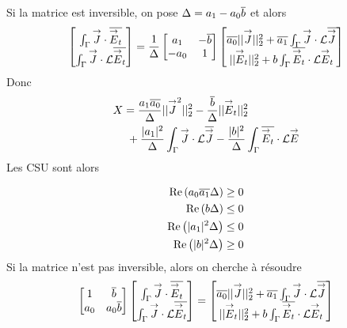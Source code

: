       Si la matrice est inversible, on pose \(\Delta = a_1 - a_0\conj{b}\) et alors
      \[
      \begin{bmatrix}
        \int_\Gamma \vJ \cdot \conj{\vE_t} \\
        \int_\Gamma \vJ\cdot \LL\conj{\vE_t}
      \end{bmatrix}
      =\frac{1}{\Delta}
      \begin{bmatrix}
        a_1 & -\conj{b} \\
        -a_0 & 1
      \end{bmatrix}
      \begin{bmatrix}
        \conj{a_0}||\vJ||_2^2 + \conj{a_1}\int_\Gamma \vJ \cdot \LL\conj{\vJ} \\
        ||\vE_t||_2^2 + b\int_\Gamma \conj{\vE_t} \cdot \LL\vE_t
      \end{bmatrix}
      \]
      Donc
      \begin{align*}
        X &=  \frac{a_1\conj{a_0}}{\Delta}||\vJ^2||_2^2 - \frac{\conj{b}}{\Delta}||\vE_t||_2^2 \\
        &~+\frac{|a_1|^2}{\Delta}\int_\Gamma\vJ\cdot \LL \conj{\vJ} - \frac{|b|^2}{\Delta}\int_\Gamma\conj{\vE_t}\cdot \LL\vE
      \end{align*}
      Les CSU sont alors

        \begin{align}
        \Re\left(a_0\conj{a_1}\Delta\right) &\ge 0\\
        \Re\left(b\Delta\right) &\le 0\\
        \Re\left(|a_1|^2\Delta\right) &\le 0\\
        \Re\left(|b|^2\Delta\right) &\ge 0
      \end{align}
      Si la matrice n'est pas inversible, alors on cherche à résoudre
      \[
        \begin{bmatrix}
          1 & \conj{b} \\
          a_0 & a_0\conj{b}
        \end{bmatrix}
        \begin{bmatrix}
          \int_\Gamma \vJ \cdot \conj{\vE_t} \\
          \int_\Gamma \vJ \cdot \LL\conj{\vE_t}
        \end{bmatrix}
        =
        \begin{bmatrix}
          \conj{a_0}||\vJ||_2^2 + \conj{a_1}\int_\Gamma \vJ \cdot \LL\conj{\vJ} \\
          ||\vE_t||_2^2 + b\int_\Gamma \conj{\vE_t} \cdot \LL\vE_t
        \end{bmatrix}
      \]

